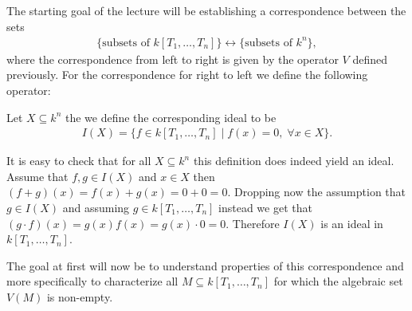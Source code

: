 \documentclass[../notes.tex]{subfiles}
\begin{document}
\smallskip
\noindent
The starting goal of the lecture will be establishing a correspondence between the
sets
\begin{align*}
  \{ \text{subsets of } k[T_1, \dots, T_n] \} \longleftrightarrow
  \{ \text{subsets of } k^n\},
\end{align*}
where the correspondence from left to right is given by the operator $V$ defined previously.
For the correspondence for right to left we define the following operator:

\smallskip
\begin{defi}{}{}
  Let $X \subseteq k^n$ the we define the corresponding ideal to be
  \begin{align*}
    I(X) = \{f \in k[T_1, \dots, T_n] \mid f(x) = 0, \; \forall x \in X\}.
  \end{align*}
\end{defi}

\smallskip
\noindent
It is easy to check that for all $X \subseteq k^n$ this definition does indeed yield an ideal.
Assume that $f,g \in I(X)$ and $x \in X$ then $(f+g)(x) = f(x) + g(x) = 0 + 0 = 0$. Dropping now
the assumption that $g \in I(X)$ and assuming $g \in k[T_1, \dots, T_n]$ instead we get that
$(g \cdot f)(x) = g(x) f(x) = g(x) \cdot 0 = 0$. Therefore $I(X)$ is an ideal in
$k[T_1, \dots, T_n]$.

\smallskip
\noindent
The goal at first will now be to understand properties of this correspondence and more
specifically to characterize all $M \subseteq k[T_1, \dots, T_n]$ for which the
algebraic set $V(M)$ is non-empty.
\end{document}
